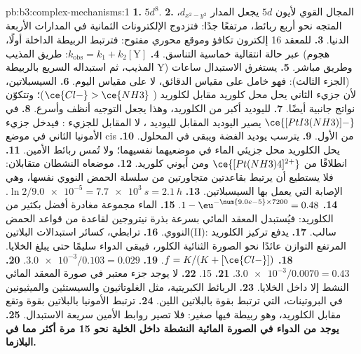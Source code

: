 \begin{solution}{pb:b3:complex-mechanisms:1}
\textbf{1.} $5d^8$.
\textbf{2.} المجال القوي لأيون $5d$ يجعل المدار $d_{x^2-y^2}$، المتجه نحو أربع
ربائط، مرتفعًا جدًا: فتزدوج الإلكترونات الثمانية في المدارات الأربعة الدنيا.
\textbf{3.} للمعقد 16 إلكترون تكافؤ وموقع محوري مفتوح: فترتبط الربيطة
الداخلة أولًا، عبر حالة انتقالية خماسية التناسق.
\textbf{4.} $k_{\mathrm{obs}} = k_1 + k_2[\mathrm Y]$: طريق المذيب (هجوم المذيب، ثم استبداله السريع بالربيطة Y)
وطريق مباشر.
\textbf{5.} يستغرق الاستبدال ساعات (الجزء الثالث): فهو خامل على مقياس الدقائق، لا على مقياس
اليوم.
\textbf{6.} السيسبلاتين، لأن جزيء  الثاني يحل محل كلوريد مقابل لكلوريد
( $\ce{Cl-} > \ce{NH3}$)؛ وتتكوّن نواتج جانبية أيضًا.
\textbf{7.} لليوديد  أكبر من الكلوريد، وهذا يجعل التوجيه
أنظف وأسرع.
\textbf{8.} في $\ce{[PtI3(NH3)]-}$ يصير اليوديد المقابل لليوديد ، لا المقابل
للجزيء : فيدخل جزيء الأمونيا الثاني في موضع cis من الأول.
\textbf{9.} يترسب يوديد الفضة ويبقى  في المحلول.
\textbf{10.} يحل الكلوريد محل جزيئي الماء في موضعيهما نفسيهما؛ ولا
تُمس ربائط الأمين.
\textbf{11.} انطلاقًا من $\ce{[Pt(NH3)4]^{2+}}$ ومن أيوني كلوريد.
\textbf{12.} موضعاه النشطان متقابلان: فلا يستطيع أن يرتبط بقاعدتين
متجاورتين من سلسلة الحمض النووي نفسها، وهي الإصابة التي يعمل بها
السيسبلاتين.
\textbf{13.} $\ln2/\num{9.0e-5} = \qty{7.7e3}{s} = \qty{2.1}{h}$.
\textbf{14.} $1 - \eu^{-\num{9.0e-5} \times 7200} = 0.48$.
\textbf{15.} الماء مجموعة مغادرة أفضل بكثير من الكلوريد: فيُستبدل المعقد المائي
بسرعة بذرة نيتروجين لقاعدة من قواعد الحمض النووي.
\textbf{16.} ترابطي، كسائر استبدالات البلاتين(II): 
سالب.
\textbf{17.} يدفع تركيز الكلوريد المرتفع التوازن عائدًا نحو الصورة
الثنائية الكلور، فيبقى الدواء سليمًا حتى يبلغ الخلايا.
\textbf{18.} $f = K/(K + [\ce{Cl-}])$.
\textbf{19.} $\num{3.0e-3}/0.103 = 0.029$.
\textbf{20.} $\num{3.0e-3}/0.0070 = 0.43$.
\textbf{21.} 15.
\textbf{22.} لا يوجد جزء معتبر في صورة المعقد المائي النشط إلا داخل
الخلايا.
\textbf{23.} الربائط الكبريتية، مثل الغلوتاثيون والسيستئين والميثيونين في
البروتينات، التي ترتبط بقوة بالبلاتين اللين.
\textbf{24.} ترتبط الأمونيا بالبلاتين بقوة وتقع مقابل الكلوريد، وهو ربيطة
 فيها صغير: فلا تصير روابط الأمين سريعة الاستبدال.
\textbf{25.} \textbf{يوجد من الدواء في الصورة المائية النشطة داخل الخلية نحو 15 مرة أكثر
مما في البلازما.}
\end{solution}
